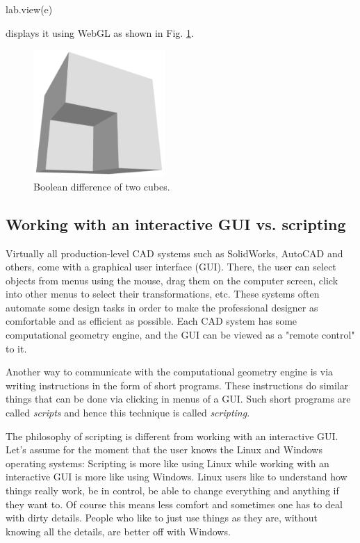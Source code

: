 \begin{bluecode}
lab.view(e)
\end{bluecode}
displays it using WebGL as shown in Fig. \ref{fig:diffcube}.

\begin{figure}[!ht]
\begin{center}
\includegraphics[width=5cm]{img/diffcube.png}
\end{center}
\vspace{-6mm}
\caption{Boolean difference of two cubes.}
\label{fig:diffcube}
\end{figure}

\subsection{Working with an interactive GUI vs. scripting}\label{subsec:scripting}

Virtually all production-level CAD systems such as SolidWorks, AutoCAD and 
others, come with a graphical user interface (GUI). There, the user 
can select objects from menus using the mouse, drag them on the computer 
screen, click into other menus to select their transformations, etc. 
These systems often automate some design tasks in order to make 
the professional designer as comfortable and as efficient as possible.
Each CAD system has some computational geometry engine, and the GUI can be 
viewed as a "remote control" to it. 

Another way to communicate with the computational geometry engine is via 
writing instructions in the form of short programs. These instructions 
do similar things that can be done via clicking in menus of a GUI. 
Such short programs are called {\em scripts}
and hence this technique is called {\em scripting}.

The philosophy of scripting is different from working with an interactive GUI. 
Let's assume for the moment that the user knows the Linux and Windows operating 
systems: Scripting is more like using Linux while working with an interactive 
GUI is more like using Windows. Linux users like to understand how things really work,
be in control, be able to change everything and anything if they want to. 
Of course this means less comfort and sometimes one has to deal with dirty details. 
People who like to just use things as they are, without knowing all the details, 
are better off with Windows. 

